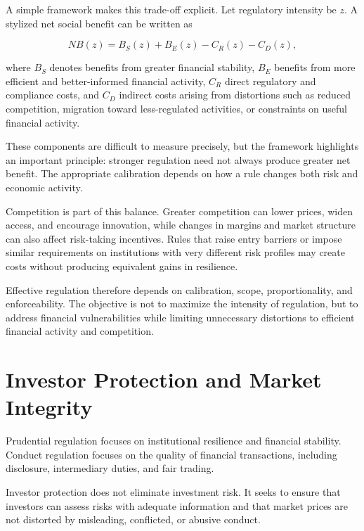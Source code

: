 A simple framework makes this trade-off explicit. Let regulatory intensity be \(z\). A stylized net social benefit can be written as

\begin{equation}
NB(z)
=B_S(z)+B_E(z)-C_R(z)-C_D(z),
\label{eq:ch23-regulatory-net-benefit}
\end{equation}

where \(B_S\) denotes benefits from greater financial stability, \(B_E\) benefits from more efficient and better-informed financial activity, \(C_R\) direct regulatory and compliance costs, and \(C_D\) indirect costs arising from distortions such as reduced competition, migration toward less-regulated activities, or constraints on useful financial activity.

These components are difficult to measure precisely, but the framework highlights an important principle: stronger regulation need not always produce greater net benefit. The appropriate calibration depends on how a rule changes both risk and economic activity.

Competition is part of this balance. Greater competition can lower prices, widen access, and encourage innovation, while changes in margins and market structure can also affect risk-taking incentives. Rules that raise entry barriers or impose similar requirements on institutions with very different risk profiles may create costs without producing equivalent gains in resilience.

Effective regulation therefore depends on calibration, scope, proportionality, and enforceability. The objective is not to maximize the intensity of regulation, but to address financial vulnerabilities while limiting unnecessary distortions to efficient financial activity and competition.


\section{Investor Protection and Market Integrity}

Prudential regulation focuses on institutional resilience and financial stability. Conduct regulation focuses on the quality of financial transactions, including disclosure, intermediary duties, and fair trading.

Investor protection does not eliminate investment risk. It seeks to ensure that investors can assess risks with adequate information and that market prices are not distorted by misleading, conflicted, or abusive conduct.



